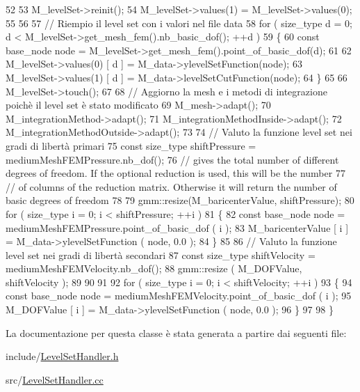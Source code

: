 \begin{DoxyCode}
52 
53     M\_levelSet->reinit();
54     M\_levelSet->values(1) = M\_levelSet->values(0);
55 
56 
57     \textcolor{comment}{// Riempio il level set con i valori nel file data}
58     \textcolor{keywordflow}{for} ( size\_type d = 0; d < M\_levelSet->get\_mesh\_fem().nb\_basic\_dof(); ++d )
59     \{
60         \textcolor{keyword}{const} base\_node node = M\_levelSet->get\_mesh\_fem().point\_of\_basic\_dof(d);
61 
62         M\_levelSet->values(0) [ d ] = M\_data->ylevelSetFunction(node);
63         M\_levelSet->values(1) [ d ] = M\_data->levelSetCutFunction(node);
64     \}
65 
66     M\_levelSet->touch();
67 
68     \textcolor{comment}{// Aggiorno la mesh e i metodi di integrazione poichè il level set è stato modificato}
69     M\_mesh->adapt();
70     M\_integrationMethod->adapt();
71     M\_integrationMethodInside->adapt();
72     M\_integrationMethodOutside->adapt();
73 
74     \textcolor{comment}{// Valuto la funzione level set nei gradi di libertà primari}
75     \textcolor{keyword}{const} size\_type shiftPressure = mediumMeshFEMPressure.nb\_dof();
76     \textcolor{comment}{// gives the total number of different degrees of freedom. If the optional reduction is used, this will
       be the number}
77     \textcolor{comment}{// of columns of the reduction matrix. Otherwise it will return the number of basic degrees of freedom}
78 
79     gmm::resize(M\_baricenterValue, shiftPressure);
80     \textcolor{keywordflow}{for} ( size\_type i = 0; i < shiftPressure; ++i )
81     \{
82         \textcolor{keyword}{const} base\_node node = mediumMeshFEMPressure.point\_of\_basic\_dof ( i );
83         M\_baricenterValue [ i ] = M\_data->ylevelSetFunction ( node, 0.0 );
84     \}
85 
86     \textcolor{comment}{// Valuto la funzione level set nei gradi di libertà secondari}
87     \textcolor{keyword}{const} size\_type shiftVelocity = mediumMeshFEMVelocity.nb\_dof();
88     gmm::resize ( M\_DOFValue, shiftVelocity );
89 
90 
91 
92     \textcolor{keywordflow}{for} ( size\_type i = 0; i < shiftVelocity; ++i )
93     \{
94         \textcolor{keyword}{const} base\_node node = mediumMeshFEMVelocity.point\_of\_basic\_dof ( i );
95         M\_DOFValue [ i ] = M\_data->ylevelSetFunction ( node, 0.0 );
96     \}
97 
98 \}
\end{DoxyCode}


La documentazione per questa classe è stata generata a partire dai seguenti file\-:\begin{DoxyCompactItemize}
\item 
include/\hyperlink{LevelSetHandler_8h}{Level\-Set\-Handler.\-h}\item 
src/\hyperlink{LevelSetHandler_8cc}{Level\-Set\-Handler.\-cc}\end{DoxyCompactItemize}

